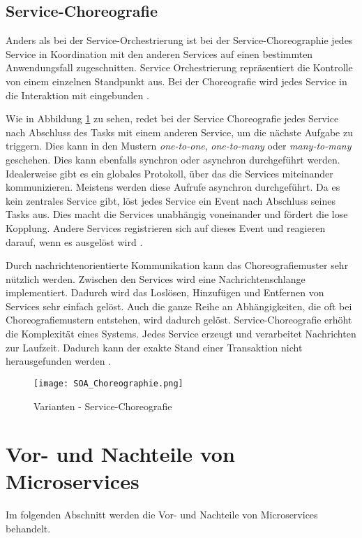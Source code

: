 \subsection{Service-Choreografie}
Anders als bei der Service-Orchestrierung ist bei der Service-Choreographie jedes Service in Koordination mit den anderen Services auf einen bestimmten Anwendungsfall zugeschnitten.
Service Orchestrierung repräsentiert die Kontrolle von einem einzelnen Standpunkt aus. Bei der Choreografie wird jedes Service in die Interaktion mit eingebunden \cite{PracticalMicroservices}. 

Wie in Abbildung \ref{fig:SOA_Choreographie} zu sehen, redet bei der Service Choreografie jedes Service nach Abschluss des Tasks mit einem anderen Service, um die nächste Aufgabe zu triggern. Dies kann in den Mustern \textit{one-to-one}, \textit{one-to-many} oder \textit{many-to-many} geschehen. Dies kann ebenfalls synchron oder asynchron durchgeführt werden. Idealerweise gibt es ein globales Protokoll, über das die Services miteinander kommunizieren. Meistens werden diese Aufrufe asynchron durchgeführt. Da es kein zentrales Service gibt, löst jedes Service ein Event nach Abschluss seines Tasks aus. Dies macht die Services unabhängig voneinander und fördert die lose Kopplung. Andere Services registrieren sich auf dieses Event und reagieren darauf, wenn es ausgelöst wird \cite{PracticalMicroservices}. 

Durch nachrichtenorientierte Kommunikation kann das Choreografiemuster sehr nützlich werden. Zwischen den Services wird eine Nachrichtenschlange implementiert. Dadurch wird das Loslösen, Hinzufügen und Entfernen von Services sehr einfach gelöst. Auch die ganze Reihe an Abhängigkeiten, die oft bei Choreografiemustern entstehen, wird dadurch gelöst. Service-Choreografie erhöht die Komplexität eines Systems. Jedes Service erzeugt und verarbeitet Nachrichten zur Laufzeit. Dadurch kann der exakte Stand einer Transaktion nicht herausgefunden werden \cite{PracticalMicroservices}.

\begin{figure}[H]
	\begin{center}
		\texttt{[image: SOA\_Choreographie.png]}
		\caption[Designvarianten - Service-Choreografie]{Varianten - Service-Choreografie \cite{PracticalMicroservices}}
		\label{fig:SOA_Choreographie}
	\end{center}
\end{figure}

\section{Vor- und Nachteile von Microservices}
Im folgenden Abschnitt werden die Vor- und Nachteile von Microservices behandelt.

